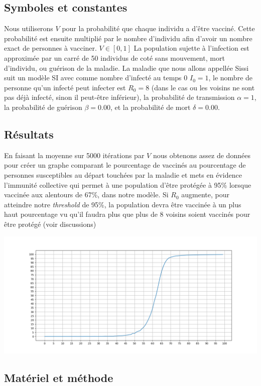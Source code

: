 \documentclass[10pt]{article}
\begin{document}
\subsection{Symboles et constantes}
Nous utiliserons $V$ pour la probabilité que chaque individu a d'être vacciné. Cette probabilité est ensuite multiplié par le nombre d'individu afin d'avoir un nombre exact de personnes à vacciner. $V \in [0,1]$
La population sujette à l'infection est approximée par un carré de 50 individus de coté sans mouvement, mort d'individu, ou guérison de la maladie.
La maladie que nous allons appellée Sissi suit un modèle SI avec comme nombre d'infecté au temps 0 $I_0 = 1$, le nombre de personne qu'un infecté peut infecter est $R_0 = 8$ (dans le cas ou les voisins ne sont pas déjà infecté, sinon il peut-être inférieur), la probabilité de transmission $\alpha = 1$, la probabilité de guérison $\beta = 0.00$, et la probabilité de mort $\delta = 0.00$.

\subsection{Résultats}
\label{sec:results}
En faisant la moyenne sur 5000 itérations par $V$ nous obtenons assez de données pour créer un graphe comparant le pourcentage de vaccinés au pourcentage de personnes susceptibles au départ touchées par la maladie et mets en évidence l'immunité collective qui permet à une population d'être protégée à 95\% lorsque vaccinée aux alentours de 67\%, dans notre modèle.
Si $R_0$ augmente, pour atteindre notre \textit{threshold} de 95\%, la population devra être vaccinée à un plus haut pourcentage vu qu'il faudra plus que plus de 8 voisins soient vaccinés pour être protégé (voir discussions)

\includegraphics[scale=0.3]{5000iter.png}


\subsection{Matériel et méthode}
\end{document}
